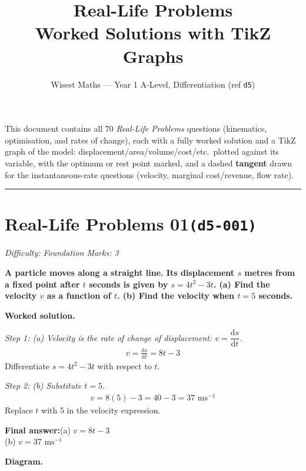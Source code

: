 \documentclass[11pt]{article}
\title{\textbf{Real-Life Problems}\\[0.3em]\large Worked Solutions with TikZ Graphs}
\author{Wisest Maths --- Year 1 A-Level, Differentiation (ref \texttt{d5})}
\date{}
\newcommand{\question}[1]{\par\medskip\noindent\textbf{#1}\par}
\begin{document}
\maketitle
\noindent This document contains all 70 \emph{Real-Life Problems} questions (kinematics,
optimisation, and rates of change), each with a fully worked solution and a TikZ graph of the model:
displacement/area/volume/cost/etc.\ plotted against its variable, with the optimum or rest point marked,
and a dashed \textbf{tangent} drawn for the instantaneous-rate questions (velocity, marginal cost/revenue,
flow rate).
\tableofcontents
\bigskip
\hrule

\section*{Real-Life Problems 01\quad\small\texttt{(d5-001)}}
\textit{Difficulty: Foundation \quad\textbar\quad Marks: 3}

\question{A particle moves along a straight line. Its displacement \( s \) metres from a fixed point after \( t \) seconds is given by \( s = 4t^2 - 3t \). (a) Find the velocity \( v \) as a function of \( t \). (b) Find the velocity when \( t = 5 \) seconds.}

\textbf{Worked solution.}

\textit{Step 1: (a) Velocity is the rate of change of displacement: \( v = \dfrac{\mathrm{d}s}{\mathrm{d}t} \).}
\[\begin{gathered}
v = \frac{\mathrm{d}s}{\mathrm{d}t} = 8t - 3
\end{gathered}\]
Differentiate \( s = 4t^2 - 3t \) with respect to \( t \).

\textit{Step 2: (b) Substitute \( t = 5 \).}
\[\begin{gathered}
v = 8(5) - 3 = 40 - 3 = 37 \text{ ms}^{-1}
\end{gathered}\]
Replace \( t \) with 5 in the velocity expression.

\begin{answerbox}
\textbf{Final answer:}\quad (a) \(\displaystyle  v = 8t - 3 \) \\[3pt]  (b) \(\displaystyle  v = 37 \text{ ms}^{-1} \)
\end{answerbox}
\textbf{Diagram.}
\end{document}

